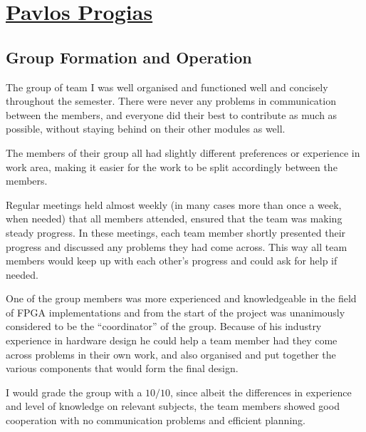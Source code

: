 
\section{\texorpdfstring{\href{mailto:pp5g11@ecs.soton.ac.uk}{Pavlos Progias}} {Pavlos Progias}}

\subsection{Group Formation and Operation}
\label{sec:formation}

%

The group of team I was well organised and functioned well and concisely throughout the semester. There were never any problems in communication between the members, and everyone did their best to contribute as much as possible, without staying behind on their other modules as well.

The members of their group all had slightly different preferences or experience in work area, making it easier for the work to be split accordingly between the members.

Regular meetings held almost weekly (in many cases more than once a week, when needed) that all members attended, ensured that the team was making steady progress. In these meetings, each team member shortly presented their progress and discussed any problems they had come across. This way all team members would keep up with each other's progress and could ask for help if needed.

One of the group members was more experienced and knowledgeable in the field of FPGA implementations and from the start of the project was unanimously considered to be the ``coordinator'' of the group. Because of his industry experience in hardware design he could help a team member had they come across problems in their own work, and also organised and put together the various components that would form the final design.

I would grade the group with a $10/10$, since albeit the differences in experience and level of knowledge on relevant subjects, the team members showed good cooperation with no communication problems and efficient planning.











